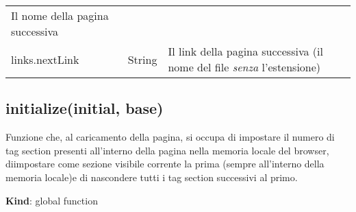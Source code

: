 \begin{longtable}[]{@{}lll@{}}
\begin{minipage}[t]{0.30\columnwidth}
Il nome della pagina successiva\strut
\end{minipage}\tabularnewline
\begin{minipage}[t]{0.30\columnwidth}\raggedright
links.nextLink\strut
\end{minipage} & \begin{minipage}[t]{0.30\columnwidth}\raggedright
String\strut
\end{minipage} & \begin{minipage}[t]{0.30\columnwidth}\raggedright
Il link della pagina successiva (il nome del file \emph{senza}
l'estensione)\strut
\end{minipage}\tabularnewline
\bottomrule
\end{longtable}

\hypertarget{initializeinitial-base}{%
\subsection{initialize(initial, base)}\label{initializeinitial-base}}

Funzione che, al caricamento della pagina, si occupa di impostare il
numero di tag section presenti all'interno della pagina nella memoria
locale del browser, diimpostare come sezione visibile corrente la prima
(sempre all'interno della memoria locale)e di nascondere tutti i tag
section successivi al primo.

\textbf{Kind}: global function

